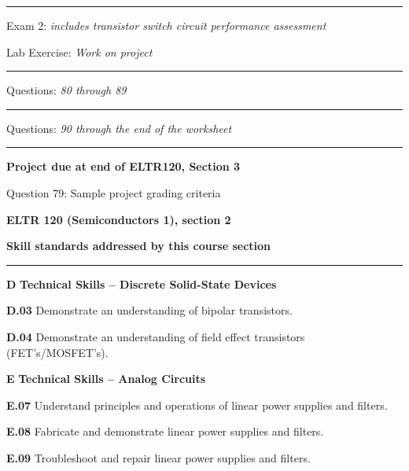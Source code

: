 \vskip 10pt
\hrule \vskip 5pt
\noindent
{}

\hskip 10pt Exam 2: {\it includes transistor switch circuit performance assessment}
 
\hskip 10pt Lab Exercise: {\it Work on project}

\vskip 10pt
\hrule \vskip 5pt
\noindent
{}

\hskip 10pt Questions: {\it 80 through 89}
 
\vskip 10pt
\hrule \vskip 5pt
\noindent
{}

\hskip 10pt Questions: {\it 90 through the end of the worksheet}
 
\vskip 10pt
\hrule \vskip 5pt
\noindent
{}

\hskip 10pt {\bf Project due at end of ELTR120, Section 3}
 
\hskip 10pt Question 79: Sample project grading criteria
 
\vskip 10pt












\vfil \eject

\centerline{\bf ELTR 120 (Semiconductors 1), section 2} \bigskip 
 
\vskip 10pt

\noindent
{\bf Skill standards addressed by this course section}

\vskip 5pt

\hrule \vskip 10pt
\noindent
{}

\vskip 5pt

\medskip
\item{\bf D} {\bf Technical Skills -- Discrete Solid-State Devices}
\item{\bf D.03} Demonstrate an understanding of bipolar transistors.
\item{\bf D.04} Demonstrate an understanding of field effect transistors (FET's/MOSFET's).
\item{\bf E} {\bf Technical Skills -- Analog Circuits}
\item{\bf E.07} Understand principles and operations of linear power supplies and filters.
\item{\bf E.08} Fabricate and demonstrate linear power supplies and filters.
\item{\bf E.09} Troubleshoot and repair linear power supplies and filters.
\medskip

